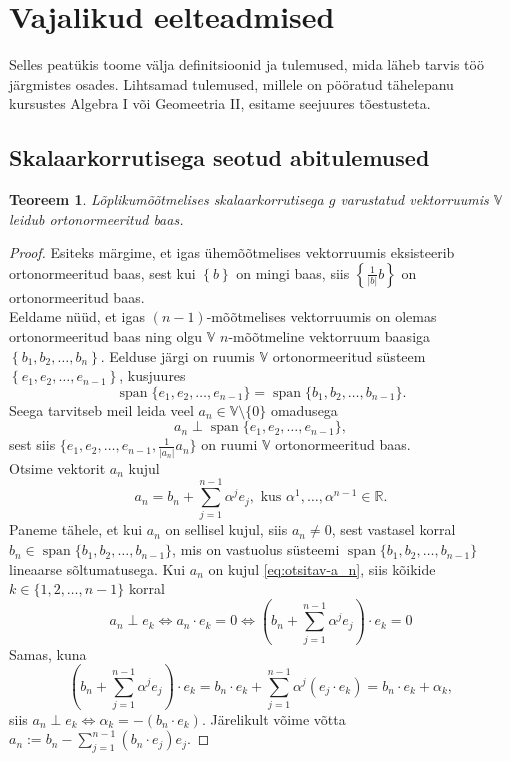 \documentclass[a4paper,12pt]{article}
\theoremstyle{plain}
\newtheorem{teoreem}{Teoreem}[section]
\theoremstyle{definition}
\numberwithin{equation}{section}
\def\R{{\mathbb R}}
\DeclareMathOperator{\spn}{span}
\begin{document}
\newpage
\section{Vajalikud eelteadmised}

Selles peatükis toome välja definitsioonid ja tulemused, mida läheb tarvis töö järgmistes osades. Lihtsamad tulemused, millele on pööratud tähelepanu kursustes Algebra I või Geomeetria II, esitame seejuures tõestusteta.

\subsection{Skalaarkorrutisega seotud abitulemused}
\label{eelteadmised:skalaar}

\begin{teoreem} \textnormal{\cite[teoreem II.7.3]{FA2}}
Lõplikumõõtmelises skalaarkorrutisega $g$ varustatud vektorruumis $\mathbb{V}$ leidub ortonormeeritud baas.
\end{teoreem}
\begin{proof}
Esiteks märgime, et igas ühemõõtmelises vektorruumis eksisteerib ortonormeeritud baas, sest kui $\left\lbrace b \right\rbrace$ on mingi baas, siis $\left\lbrace \frac{1}{|b|} b\right\rbrace$ on ortonormeeritud baas.\\
Eeldame nüüd, et igas $(n-1)$-mõõtmelises vektorruumis on olemas ortonormeeritud baas ning olgu $\mathbb{V}$ $n$-mõõtmeline vektorruum baasiga $\left\lbrace b_1, b_2, \dots, b_n \right\rbrace$. Eelduse järgi on ruumis $\mathbb{V}$ ortonormeeritud süsteem $\left\lbrace e_1, e_2, \dots, e_{n-1} \right\rbrace$, kusjuures
\[ \spn\{ e_1, e_2, \dots, e_{n-1}\} = \spn\{ b_1, b_2, \dots, b_{n-1}\}. \]
Seega tarvitseb meil leida veel $a_n \in \mathbb{V} \setminus \{0\}$ omadusega
\[a_n \perp \spn\{ e_1, e_2, \dots, e_{n-1}\},\]
sest siis $\{ e_1, e_2, \dots, e_{n-1}, \frac{1}{|a_n|}a_n\}$ on ruumi $\mathbb{V}$ ortonormeeritud baas.\\
Otsime vektorit $a_n$ kujul
\begin{equation} \label{eq:otsitav-a_n}
a_n = b_n + \sum_{j = 1}^{n-1} \alpha^j e_j, \text{ kus } \alpha^1, \dots, \alpha^{n-1} \in \R.
\end{equation}
Paneme tähele, et kui $a_n$ on sellisel kujul, siis $a_n \neq 0$, sest vastasel korral $b_n \in \spn\{ b_1, b_2, \dots, b_{n-1}\}$, mis on vastuolus süsteemi $\spn\{ b_1, b_2, \dots, b_{n-1}\}$ lineaarse sõltumatusega.
Kui $a_n$ on kujul \ref{eq:otsitav-a_n}, siis kõikide $k \in \{1, 2, \dots, n-1\}$ korral
\begin{equation*}
a_n \perp e_k \iff a_n \cdot e_k = 0 \iff \left(b_n + \sum_{j = 1}^{n-1} \alpha^j e_j\right) \cdot e_k = 0
\end{equation*}
Samas, kuna
\begin{equation*}
\left(b_n + \sum_{j = 1}^{n-1} \alpha^j e_j\right) \cdot e_k = b_n \cdot e_k + \sum_{j = 1}^{n-1} \alpha^j \left(e_j \cdot e_k \right) = b_n \cdot e_k + \alpha_k,
\end{equation*}
siis $a_n \perp e_k \iff \alpha_k = - \left(b_n \cdot e_k \right)$. \newline
Järelikult võime võtta $a_n := b_n - \sum_{j=1}^{n-1}\left(b_n \cdot e_j\right)e_j$.
\end{proof}
\end{document}
